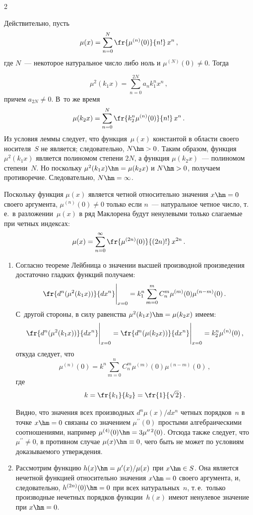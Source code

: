 \begin{multicols}{2}
{  Действительно, пусть 
  $$
  \mu(x)=\sum\limits_{n=0}^N \fr{\mu^{(n)}(0)}{n!}\, 
x^n\,,
$$
где $N$~--- некоторое натуральное число либо ноль и 
$\mu^{(N)}(0)\not=0$. Тогда 

\noindent
$$
\mu^2(k_1 x) = \sum\limits_{n=0}^{2N} 
a_n k_1^n x^n\,,
$$
причем $a_{2N}\not=0$. В~то же время 
$$\mu(k_2 x)  =\sum\limits_{n=0}^N \fr{k_2^n\mu^{(n)}(0)}{n!}\,x^n\,.$$ 
Из условия леммы 
следует, что функция~$\mu(x)$ константой в области своего носителя~$S$ не 
является; следовательно, $N\hm>0$. Таким образом, функция $\mu^2(k_1 
x)$ является полиномом степени $2N$, а функция $\mu(k_2 x)$~--- 
полиномом степени~$N$. Но поскольку $\mu^2(k_1 x)\hm=\mu(k_2 x)$ 
и $N\hm>0$, получаем противоречие. Следовательно, $N\hm=\infty$. 
  
  Поскольку функция $\mu(x)$ является четной относительно значения 
$x\hm=0$ своего аргумента, $\mu^{(n)}(0)\not=0$ только если $n$~--- 
натуральное четное число, т.\,е.\ в разложении~$\mu(x)$ в ряд Маклорена будут 
ненулевыми только слагаемые при четных индексах: 
$$
\mu(x)= \sum\limits_{n=0}^\infty \fr{\mu^{(2n)}(0)}{(2n)!}\,x^{2n}\,.
$$
  \begin{enumerate}[1.]
  \item Согласно теореме Лейбница о значении высшей производной 
произведения достаточно гладких функций получаем:
  \begin{equation*}
  \fr{d^n(\mu^2(k_1 x))}{dx^n}\Bigg\vert_{x=0}=
k_1^n\sum\limits_{m=0}^m 
C_n^m \mu^{(m)}(0) \mu^{(n-m)}(0)\,.
  \end{equation*} 
  С~другой стороны, в силу равенства $\mu^2(k_1 x)\hm= \mu(k_2 x)$ 
имеем: 
  \begin{equation*}
  \fr{d^n(\mu^2(k_1 x))}{dx^n}\Bigg\vert_{x=0}=\fr{d^n(\mu(k_2 
x))}{dx^n}\Bigg\vert_{x=0}=
k_2^n \mu^{(n)}(0)\,,
  \end{equation*} 
  откуда следует, что 
  \begin{equation}
  \mu^{(n)}(0)=k^n\sum\limits_{m=0}^n C_n^m \mu^{(m)}(0)\mu^{(n-
m)}(0)\,,
  \label{e2sem}
\end{equation}
где
$$
  k=\fr{k_1}{k_2}=\fr{1}{\sqrt{2}}\,.
  $$
  
  Видно, что значения всех производных $d^n\mu(x)/dx^n$ четных 
порядков~$n$ в точке $x\hm=0$ связаны со значением $\mu^{\prime\prime}(0)$ 
простыми алгебраическими соотношениями, например $\mu^{(4)}(0)\hm= 
3\mu^{\prime\prime\,2}(0)$. Отсюда также следует, что 
$\mu^{\prime\prime}\not=0$, в противном случае $\mu(x)\hm\equiv 0$, чего быть 
не может по условиям доказываемого утверждения.
  \item  Рассмотрим функцию $h(x)\hm= \mu^\prime(x)/\mu(x)$ при $x\hm\in S$. 
Она является нечетной функцией относительно значения $x\hm=0$ своего 
аргумента, и, следовательно, $h^{(2n)}(0)\hm=0$ при всех натуральных~$n$, 
т.\,е.\ только производные нечетных порядков функции~$h(x)$ имеют 
ненулевое значение при $x\hm=0$.
  

\end{enumerate}}
\end{multicols}
